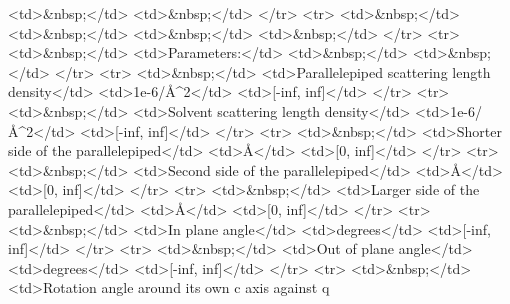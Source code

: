 \textless{}td\textgreater{}\&nbsp;\textless{}/td\textgreater{} \textless{}td\textgreater{}\&nbsp;\textless{}/td\textgreater{} \textless{}/tr\textgreater{} \textless{}tr\textgreater{} \textless{}td\textgreater{}\&nbsp;\textless{}/td\textgreater{} \textless{}td\textgreater{}\&nbsp;\textless{}/td\textgreater{} \textless{}td\textgreater{}\&nbsp;\textless{}/td\textgreater{} \textless{}td\textgreater{}\&nbsp;\textless{}/td\textgreater{} \textless{}/tr\textgreater{} \textless{}tr\textgreater{} \textless{}td\textgreater{}\&nbsp;\textless{}/td\textgreater{} \textless{}td\textgreater{}Parameters:\textless{}/td\textgreater{} \textless{}td\textgreater{}\&nbsp;\textless{}/td\textgreater{} \textless{}td\textgreater{}\&nbsp;\textless{}/td\textgreater{} \textless{}/tr\textgreater{} \textless{}tr\textgreater{} \textless{}td\textgreater{}\&nbsp;\textless{}/td\textgreater{} \textless{}td\textgreater{}Parallelepiped scattering length density\textless{}/td\textgreater{} \textless{}td\textgreater{}1e-6/\AA{}\textasciicircum{}2\textless{}/td\textgreater{} \textless{}td\textgreater{}[-inf, inf]\textless{}/td\textgreater{} \textless{}/tr\textgreater{} \textless{}tr\textgreater{} \textless{}td\textgreater{}\&nbsp;\textless{}/td\textgreater{} \textless{}td\textgreater{}Solvent scattering length density\textless{}/td\textgreater{} \textless{}td\textgreater{}1e-6/\AA{}\textasciicircum{}2\textless{}/td\textgreater{} \textless{}td\textgreater{}[-inf, inf]\textless{}/td\textgreater{} \textless{}/tr\textgreater{} \textless{}tr\textgreater{} \textless{}td\textgreater{}\&nbsp;\textless{}/td\textgreater{} \textless{}td\textgreater{}Shorter side of the parallelepiped\textless{}/td\textgreater{} \textless{}td\textgreater{}\AA{}\textless{}/td\textgreater{} \textless{}td\textgreater{}[0, inf]\textless{}/td\textgreater{} \textless{}/tr\textgreater{} \textless{}tr\textgreater{} \textless{}td\textgreater{}\&nbsp;\textless{}/td\textgreater{} \textless{}td\textgreater{}Second side of the parallelepiped\textless{}/td\textgreater{} \textless{}td\textgreater{}\AA{}\textless{}/td\textgreater{} \textless{}td\textgreater{}[0, inf]\textless{}/td\textgreater{} \textless{}/tr\textgreater{} \textless{}tr\textgreater{} \textless{}td\textgreater{}\&nbsp;\textless{}/td\textgreater{} \textless{}td\textgreater{}Larger side of the parallelepiped\textless{}/td\textgreater{} \textless{}td\textgreater{}\AA{}\textless{}/td\textgreater{} \textless{}td\textgreater{}[0, inf]\textless{}/td\textgreater{} \textless{}/tr\textgreater{} \textless{}tr\textgreater{} \textless{}td\textgreater{}\&nbsp;\textless{}/td\textgreater{} \textless{}td\textgreater{}In plane angle\textless{}/td\textgreater{} \textless{}td\textgreater{}degrees\textless{}/td\textgreater{} \textless{}td\textgreater{}[-inf, inf]\textless{}/td\textgreater{} \textless{}/tr\textgreater{} \textless{}tr\textgreater{} \textless{}td\textgreater{}\&nbsp;\textless{}/td\textgreater{} \textless{}td\textgreater{}Out of plane angle\textless{}/td\textgreater{} \textless{}td\textgreater{}degrees\textless{}/td\textgreater{} \textless{}td\textgreater{}[-inf, inf]\textless{}/td\textgreater{} \textless{}/tr\textgreater{} \textless{}tr\textgreater{} \textless{}td\textgreater{}\&nbsp;\textless{}/td\textgreater{} \textless{}td\textgreater{}Rotation angle around its own c axis against q 